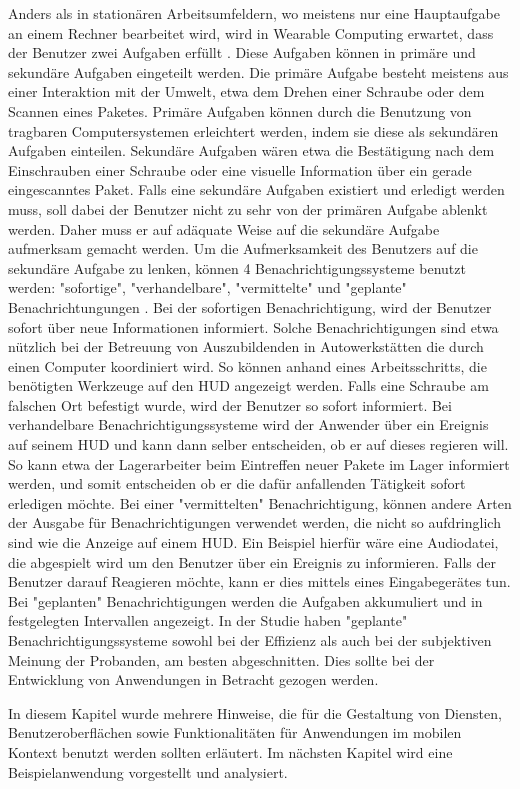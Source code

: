 Anders als in stationären Arbeitsumfeldern, wo meistens nur eine Hauptaufgabe an einem Rechner bearbeitet wird, wird in Wearable Computing erwartet, dass der Benutzer zwei Aufgaben erfüllt \cite{Witt:2006hi}. Diese Aufgaben können in primäre und sekundäre Aufgaben eingeteilt werden. Die primäre Aufgabe besteht meistens aus einer Interaktion mit der Umwelt, etwa dem Drehen einer Schraube oder dem Scannen eines Paketes. Primäre Aufgaben können durch die Benutzung von tragbaren Computersystemen erleichtert werden, indem sie diese als sekundären Aufgaben einteilen. Sekundäre Aufgaben wären etwa die Bestätigung nach dem Einschrauben einer Schraube oder eine visuelle Information über ein gerade eingescanntes Paket. Falls eine sekundäre Aufgaben existiert und erledigt werden muss, soll dabei der Benutzer nicht zu sehr von der primären Aufgabe ablenkt werden. Daher muss er auf adäquate Weise auf die sekundäre Aufgabe aufmerksam gemacht werden. Um die Aufmerksamkeit des Benutzers auf die sekundäre Aufgabe zu lenken, können 4 Benachrichtigungssysteme benutzt werden: "sofortige", "verhandelbare", "vermittelte" und "geplante" Benachrichtungungen \cite{McFarlane:1999um}\cite{Nilsson:cq}. Bei der sofortigen Benachrichtigung, wird der Benutzer sofort über neue Informationen informiert. Solche Benachrichtigungen sind etwa nützlich bei der Betreuung von Auszubildenden in Autowerkstätten die durch einen Computer koordiniert wird. So können anhand eines Arbeitsschritts, die benötigten Werkzeuge auf den HUD angezeigt werden. Falls eine Schraube am falschen Ort befestigt wurde, wird  der Benutzer so sofort informiert. Bei verhandelbare Benachrichtigungssysteme wird der Anwender über ein Ereignis auf seinem HUD und kann dann selber entscheiden, ob er auf dieses regieren will. So kann etwa der Lagerarbeiter beim Eintreffen neuer Pakete im Lager informiert werden, und somit entscheiden ob er die dafür anfallenden Tätigkeit sofort erledigen möchte. Bei einer "vermittelten" Benachrichtigung, können andere Arten der Ausgabe für Benachrichtigungen verwendet werden, die nicht so aufdringlich sind wie die Anzeige auf einem HUD. Ein Beispiel hierfür wäre eine Audiodatei, die abgespielt wird um den Benutzer über ein Ereignis zu informieren. Falls der Benutzer darauf Reagieren möchte, kann er  dies mittels eines Eingabegerätes tun. Bei "geplanten" Benachrichtigungen werden die Aufgaben  akkumuliert und in festgelegten Intervallen angezeigt. In der Studie \cite{Nilsson:cq}  haben "geplante" Benachrichtigungssysteme sowohl bei der Effizienz als auch bei der subjektiven Meinung der Probanden,  am besten abgeschnitten. Dies sollte bei der Entwicklung von Anwendungen in Betracht gezogen werden.


In diesem Kapitel wurde mehrere Hinweise, die für die Gestaltung von Diensten, Benutzeroberflächen sowie Funktionalitäten für Anwendungen im mobilen Kontext benutzt werden sollten erläutert. Im nächsten Kapitel wird eine Beispielanwendung vorgestellt und analysiert.

